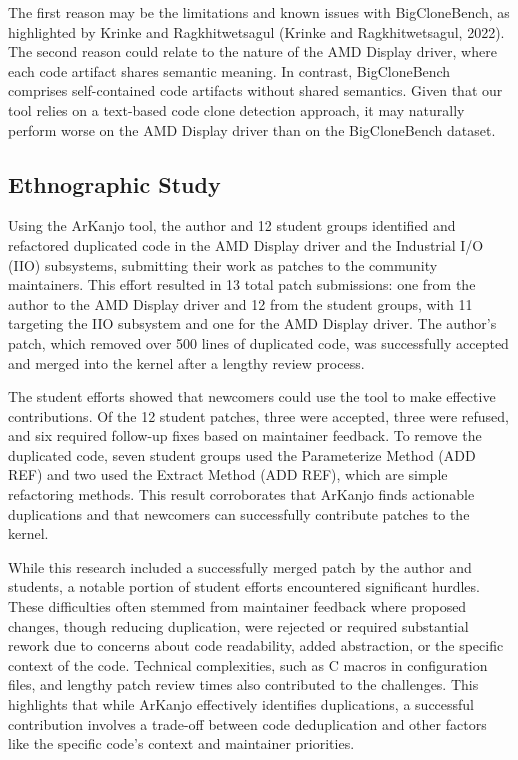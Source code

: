 \documentclass[conference]{IEEEtran}
\begin{document}
The first reason may be the limitations and known issues with BigCloneBench, as
highlighted by Krinke and Ragkhitwetsagul (Krinke and Ragkhitwetsagul, 2022). The
second reason could relate to the nature of the AMD Display driver, where each code artifact
shares semantic meaning. In contrast, BigCloneBench comprises self-contained code
artifacts without shared semantics. Given that our tool relies on a text-based code clone
detection approach, it may naturally perform worse on the AMD Display driver than on the
BigCloneBench dataset.

\subsection{Ethnographic Study}

Using the ArKanjo tool, the author and 12 student groups identified and refactored duplicated 
code in the AMD Display driver and the Industrial I/O (IIO) subsystems, submitting their work 
as patches to the community maintainers. This effort resulted in 13 total patch submissions: 
one from the author to the AMD Display driver and 12 from the student groups, with 11 targeting 
the IIO subsystem and one for the AMD Display driver. The author's patch, which removed over 
500 lines of duplicated code, was successfully accepted and merged into the kernel after a 
lengthy review process.

The student efforts showed that newcomers could use the tool to make effective contributions. 
Of the 12 student patches, three were accepted, three were refused, and six required follow-up 
fixes based on maintainer feedback. To remove the duplicated code, seven student groups used the 
Parameterize Method (ADD REF) and two used the Extract Method (ADD REF), which are simple refactoring methods. 
This result corroborates that ArKanjo finds actionable duplications and that newcomers can 
successfully contribute patches to the kernel.

While this research included a successfully merged patch by the author and students,
a notable portion of student efforts encountered
significant hurdles. These difficulties often stemmed from maintainer feedback where
proposed changes, though reducing duplication, were rejected or required substantial
rework due to concerns about code readability, added abstraction, or the specific context
of the code. Technical complexities, such as C macros in configuration files, and lengthy
patch review times also contributed to the challenges. 
This highlights that while ArKanjo effectively identifies duplications, a successful 
contribution involves a trade-off between code deduplication and other factors like the 
specific code's context and maintainer priorities.
\end{document}
